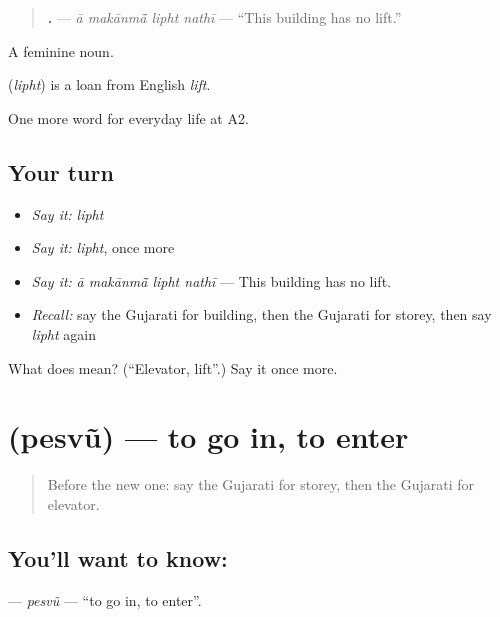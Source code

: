 \begin{quote}
\textbf{   .} — \emph{ā makānmā̃ lipht nathī} — \textquotedblleft{}This building has no lift.\textquotedblright{}
\end{quote}

A feminine noun.

\begin{cousinweb}
\textbf{} (\emph{lipht}) is a loan from English \emph{lift}.
\end{cousinweb}

\begin{grammarlens}[title={What you've built}]
One more word for everyday life at A2.
\end{grammarlens}

\subsection*{Your turn}
\begin{itemize}
\raggedright
  \item \emph{Say it:} \emph{lipht}
  \item \emph{Say it:} \emph{lipht}, once more
  \item \emph{Say it:} \emph{ā makānmā̃ lipht nathī} — This building has no lift.
  \item \emph{Recall:} say the Gujarati for building, then the Gujarati for storey, then say \emph{lipht} again
\end{itemize}

\begin{tcolorbox}[breakable,colback=teal!4,colframe=teal!35!black,title={Before you move on}]
What does  mean? (\textquotedblleft{}Elevator, lift\textquotedblright{}.) Say it once more.
\end{tcolorbox}
\section[\texorpdfstring{\gu{પેસવું} (pesvũ)}{પેસવું (pesvũ)}]{ (pesvũ) — to go in, to enter}

\label{lesson:GU-C196-pesvu}



\begin{quote}
Before the new one: say the Gujarati for storey, then the Gujarati for elevator.
\end{quote}

\subsection*{You'll want to know: }
\textbf{} — \emph{pesvũ} — \textquotedblleft{}to go in, to enter\textquotedblright{}.

